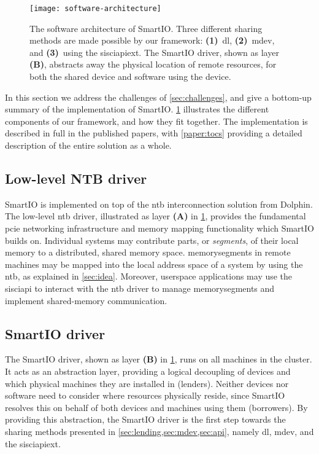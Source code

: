 \begin{figure}
    \centering
    \texttt{[image: software-architecture]}
    \caption[Three different sharing methods are made possible by our framework. The SmartIO driver abstracts away the physical location of a remote resource]
    {The software architecture of SmartIO. Three different sharing methods are made possible by our framework: \textbf{(1)}~\gls{dl}, \textbf{(2)}~\gls{mdev}, and \textbf{(3)}~using the \gls{sisciapiext}. The SmartIO driver, shown as layer \textbf{(B)}, abstracts away the physical location of remote resources, for both the shared device and software using the device.}
    \label{fig:architecture}
\end{figure}


In this section we address the challenges of \cref{sec:challenges}, and give a bottom-up summary of the implementation of SmartIO.
%
\cref{fig:architecture} illustrates the different components of our framework, and how they fit together.
%
The implementation is described in full in the published papers, with \cref{paper:tocs} providing a detailed description of the entire solution as a whole.



\subsection{Low-level NTB driver}\label{sec:ntb-driver}
SmartIO is implemented on top of the \gls{ntb} interconnection solution from Dolphin.
%
The low-level \gls{ntb} driver, illustrated as layer \textbf{(A)} in \cref{fig:architecture}, provides the fundamental \gls{pcie} networking infrastructure and memory mapping functionality which SmartIO builds on.
%
Individual systems may contribute parts, or \emph{\glspl{segment}}, of their local memory to a distributed, shared memory space. 
%
\Glspl{memorysegment} in remote machines may be mapped into the local address space of a system by using the \gls{ntb}, as explained in \cref{sec:idea}.
%
Moreover, \gls{userspace} applications may use the \gls{sisciapi} to interact with the \gls{ntb} driver to manage \glspl{memorysegment} and implement shared-memory communication.



\subsection{SmartIO driver}\label{sec:smartio-driver}
The SmartIO driver, shown as layer \textbf{(B)} in \cref{fig:architecture}, runs on all machines in the cluster.
%
It acts as an abstraction layer, providing a logical decoupling of devices and which physical machines they are installed in (\glspl{lender}).
%
Neither devices nor software need to consider where resources physically reside, since SmartIO resolves this on behalf of both devices and machines using them (\glspl{borrower}).
%
By providing this abstraction, the SmartIO driver is the first step towards the sharing methods presented in \cref{sec:lending,sec:mdev,sec:api}, namely \gls{dl}, \gls{mdev}, and the \gls{sisciapiext}.


